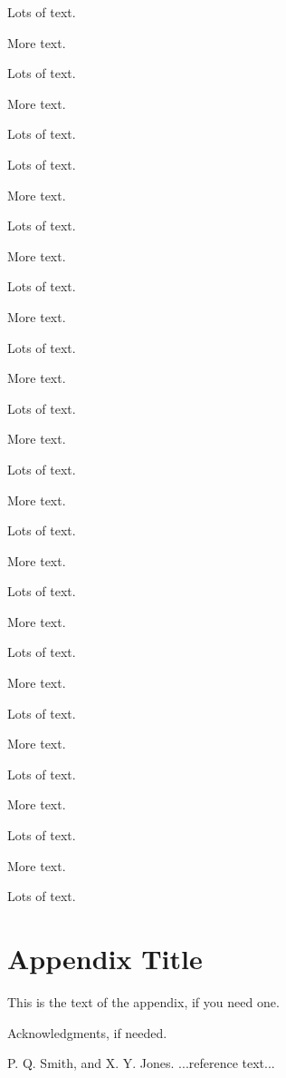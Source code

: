 \documentclass{sigplanconf}
\begin{document}
Lots of text.

More text.

Lots of text.

More text.

Lots of text.


Lots of text.

More text.

Lots of text.

More text.

Lots of text.

More text.

Lots of text.

More text.

Lots of text.

More text.

Lots of text.

More text.

Lots of text.

More text.

Lots of text.

More text.

Lots of text.

More text.

Lots of text.

More text.

Lots of text.

More text.

Lots of text.

More text.

Lots of text.

\appendix
\section{Appendix Title}

This is the text of the appendix, if you need one.

\acks

Acknowledgments, if needed.





\begin{thebibliography}{}
\softraggedright

P. Q. Smith, and X. Y. Jones. ...reference text...

\end{thebibliography}
\end{document}
